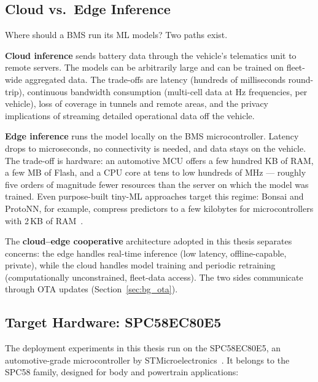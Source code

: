 \subsection{Cloud vs.\ Edge Inference}

Where should a BMS run its ML models? Two paths exist.

\textbf{Cloud inference} sends battery data through the vehicle's telematics unit to remote servers. The models can be arbitrarily large and can be trained on fleet-wide aggregated data. The trade-offs are latency (hundreds of milliseconds round-trip), continuous bandwidth consumption (multi-cell data at Hz frequencies, per vehicle), loss of coverage in tunnels and remote areas, and the privacy implications of streaming detailed operational data off the vehicle.

\textbf{Edge inference} runs the model locally on the BMS microcontroller. Latency drops to microseconds, no connectivity is needed, and data stays on the vehicle. The trade-off is hardware: an automotive MCU offers a few hundred KB of RAM, a few MB of Flash, and a CPU core at tens to low hundreds of MHz --- roughly five orders of magnitude fewer resources than the server on which the model was trained. Even purpose-built tiny-ML approaches target this regime: Bonsai and ProtoNN, for example, compress predictors to a few kilobytes for microcontrollers with 2\,KB of RAM~\autocite{bonsai2017,protonn2017}.

The \textbf{cloud--edge cooperative} architecture adopted in this thesis separates concerns: the edge handles real-time inference (low latency, offline-capable, private), while the cloud handles model training and periodic retraining (computationally unconstrained, fleet-data access). The two sides communicate through OTA updates (Section~\ref{sec:bg_ota}).

\subsection{Target Hardware: SPC58EC80E5}

The deployment experiments in this thesis run on the SPC58EC80E5, an automotive-grade microcontroller by STMicroelectronics~\autocite{spc58ec80e5_ds}. It belongs to the SPC58 family, designed for body and powertrain applications:

